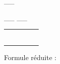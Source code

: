 \documentclass[11pt,a4paper]{article}
\begin{document}
\begin{table}[!ht]
  \centering
  \begin{minipage}{0.08\textwidth}
    \centering

\vfillFirst

\_\_


\vfillLast

  \end{minipage}
  \hfillx
  \begin{minipage}{0.37\textwidth}
    \centering

\begin{center}

\_\_  \_\_


\medskip


\begin{tabular}{|C{0.75cm} | C{0.75cm}|C{0.75cm}|C{0.75cm}|C{0.75cm}|}
\hline
{}  &   &  &  &  \\
  &   &  &  &  \\
\hline
{}  &  & & & \\
  &  & & & \\ \hline
{}  &  & & & \\
  &  & & & \\ \hline
\end{tabular}

\end{center}

  \end{minipage}
  \hfillx
  \begin{minipage}{0.55\textwidth}
    \centering

Formule réduite :

\vspace{2cm}

\vfillFirst

\phantom{42}


\vfillLast

  \end{minipage}
\end{table}
\end{document}

